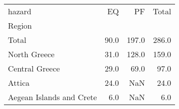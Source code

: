 \begin{tabular}{lrrr}
\toprule
hazard &    EQ &     PF &  Total \\
Region                   &       &        &        \\
\midrule
Total                    &  90.0 &  197.0 &  286.0 \\
North Greece             &  31.0 &  128.0 &  159.0 \\
Central Greece           &  29.0 &   69.0 &   97.0 \\
Attica                   &  24.0 &    NaN &   24.0 \\
Aegean Islands and Crete &   6.0 &    NaN &    6.0 \\
\bottomrule
\end{tabular}

